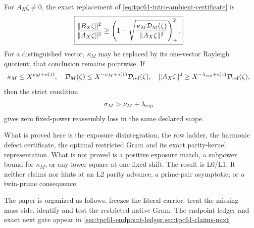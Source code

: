 For \(A_X\zeta\ne0\), the exact replacement of
\eqref{eq:tpc61-intro-ambient-certificate} is
\begin{equation}
 \boxed{
 \frac{\|B_X\zeta\|^2}{\|A_X\zeta\|^2}
 \ge
 \left(
  1-\sqrt{
   \frac{\kappa_M\mathcal D_M(\zeta)}{\|A_X\zeta\|^2}}
 \right)_+^2.}
 \label{eq:tpc61-intro-restricted-certificate}
\end{equation}
For a distinguished vector, \(\kappa_M\) may be replaced by its one-vector
Rayleigh quotient; that conclusion remains pointwise.  If
\begin{equation}
 \kappa_M\le X^{\nu_M+o(1)},
 \quad
 \mathcal D_M(\zeta)\le X^{-\sigma_M+o(1)}
                   \mathcal D_{\rm ref}(\zeta),
 \quad
 \|A_X\zeta\|^2\ge
 X^{-\lambda_{\rm rep}+o(1)}\mathcal D_{\rm ref}(\zeta),
 \label{eq:tpc61-intro-three-exponents}
\end{equation}
then the strict condition
\begin{equation}
 \sigma_M>\nu_M+\lambda_{\rm rep}
 \label{eq:tpc61-intro-zero-cost-condition}
\end{equation}
gives zero fixed-power reassembly loss in the same declared scope.

What is proved here is the exposure disintegration, the row ladder, the
harmonic defect certificate, the optimal restricted Gram and its exact
parity-kernel representation.  What is not proved is a positive exposure
match, a subpower bound for \(\kappa_M\), or any lower square at one fixed
shift.  The result is L0/L1.  It neither claims nor hints at an L2 parity
advance, a prime-pair asymptotic, or a twin-prime consequence.

 The paper is organized as follows.  
 freezes the literal carrier.
 treat the missing-mass side.
 identify and test the restricted native
Gram.  The endpoint ledger and exact next gate appear in
\cref{sec:tpc61-endpoint-ledger,sec:tpc61-claims-next}.
